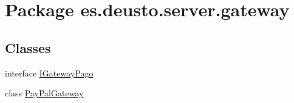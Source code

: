 \hypertarget{namespacees_1_1deusto_1_1server_1_1gateway}{}\section{Package es.\+deusto.\+server.\+gateway}
\label{namespacees_1_1deusto_1_1server_1_1gateway}
\subsection*{Classes}
\begin{DoxyCompactItemize}
\item 
interface \mbox{\hyperlink{interfacees_1_1deusto_1_1server_1_1gateway_1_1_i_gateway_pago}{I\+Gateway\+Pago}}
\item 
class \mbox{\hyperlink{classes_1_1deusto_1_1server_1_1gateway_1_1_pay_pal_gateway}{Pay\+Pal\+Gateway}}
\end{DoxyCompactItemize}

